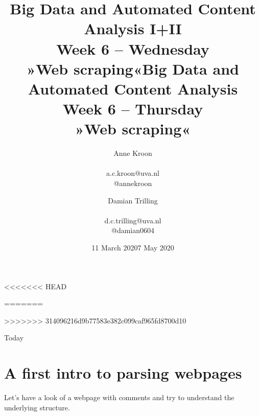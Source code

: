 \documentclass{beamer}
\begin{document}
	

<<<<<<< HEAD
\title[Big Data  and Automated Content Analysis]{\textbf{Big Data  and Automated Content Analysis I+II} \\ Week 6 -- Wednesday\\ »Web scraping«}
\author[Anne Kroon]{Anne Kroon \\ ~ \\ \footnotesize{a.c.kroon@uva.nl \\@annekroon} \\ }
\date{11 March 2020}
=======
\title[Big Data  and Automated Content Analysis]{\textbf{Big Data  and Automated Content Analysis} \\ Week 6 -- Thursday\\ »Web scraping«}
\author{Damian Trilling \\ ~ \\ \footnotesize{d.c.trilling@uva.nl \\@damian0604} \\ }
\date{7 May 2020}
>>>>>>> 314096216d9b77583e382c099caf965fd8700d10

\begin{frame}{}
\titlepage
\end{frame}

\begin{frame}{Today}
\tableofcontents
\end{frame}


\section{A first intro to parsing webpages}

\begin{frame}
Let's have a look of a webpage with comments and try to understand the underlying structure.
\end{frame}


{
\begin{frame}[plain]
\end{frame}
\begin{frame}[plain]
\end{frame}

\begin{frame}[plain]
\end{frame}
}
\end{document}
